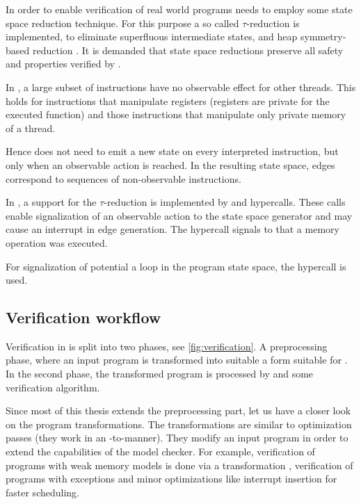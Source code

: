 In order to enable verification of real world programs \DIVINE needs to employ
some state space reduction technique. For this purpose a so called
$\tau$-reduction is implemented, to eliminate superfluous intermediate states,
and heap symmetry-based reduction \cite{Rockai13} \cite{RockaiCB17}. It is
demanded that state space reductions preserve all safety and \LTL properties
verified by \DIVINE.

In \LLVM, a large subset of instructions have no observable effect for other
threads. This holds for instructions that manipulate registers (registers are
private for the executed function) and those instructions that manipulate only
private memory of a thread.

Hence \DIVINE does not need to emit a new state on every interpreted
instruction, but only when an observable action is reached. In the resulting
state space, edges correspond to sequences of non-observable instructions.

In \DIVM, a support for the $\tau$-reduction is implemented by
 and  hypercalls. These calls enable
signalization of an observable action to the state space generator and may cause
an interrupt in edge generation. The  hypercall signals to
\DIVM that a memory operation was executed.

For signalization of potential a loop in the program state space, the
 hypercall is used.

\subsection{Verification workflow}

Verification in \DIVINE is split into two phases, see
\autoref{fig:verification}.  A preprocessing phase, where an input program is
transformed into suitable a form suitable for \DIVM. In the second phase, the
transformed program is processed by \DIVM and some verification algorithm.

Since most of this thesis extends the preprocessing part, let us have a closer
look on the program transformations. The transformations are similar to \LLVM
optimization passes (they work in an \LLVM -to-\LLVM manner). They modify an
input program in order to extend the capabilities of the model checker. For
example, verification of programs with weak memory models is done via a
transformation \cite{Still16}, verification of programs with exceptions
\cite{Still17} and minor optimizations like interrupt insertion for faster
scheduling.


